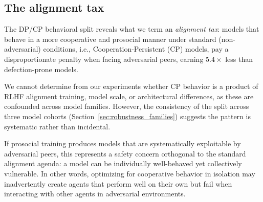 \documentclass[runningheads]{llncs}
\begin{document}
\subsection{The alignment tax}

The DP/CP behavioral split reveals what we term an \emph{alignment tax}: models that behave in a more cooperative and prosocial manner under standard (non-adversarial) conditions, i.e., Cooperation-Persistent (CP) models, pay a disproportionate penalty when facing adversarial peers, earning $5.4\times$ less than defection-prone models.

We cannot determine from our experiments whether CP behavior is a product of RLHF alignment training, model scale, or architectural differences, as these are confounded across model families. However, the consistency of the split across three model cohorts (Section~\ref{sec:robustness_families}) suggests the pattern is systematic rather than incidental.

If prosocial training produces models that are systematically exploitable by adversarial peers, this represents a safety concern orthogonal to the standard alignment agenda: a model can be individually well-behaved yet collectively vulnerable. In other words, optimizing for cooperative behavior in isolation may inadvertently create agents that perform well on their own but fail when interacting with other agents in adversarial environments.





\end{document}
